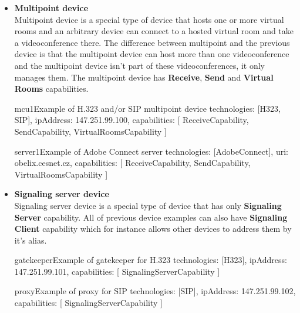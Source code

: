 \begin{itemize}
\begin{EntityExample}{}{terminal4}%
      {Example of terminal with one virtual room for H.323 and/or SIP}
technologies: [H323, SIP],
ipAddress: 147.251.99.4,
capabilities: [
  TerminalCapability,
  ReceiveCapability,
  SendCapability
  MixCapability
]
\end{EntityExample}

\item \textbf{Multipoint device} \\
  Multipoint device is a special type of device that hosts one or more virtual 
  rooms and an arbitrary device can connect to a hosted virtual room and take 
  a videoconference there. The difference between multipoint and the previous 
  device is that the multipoint device can host more than one videoconference 
  and the multipoint device isn't part of these videoconferences, it only 
  manages them. The multipoint device has \textbf{Receive}, \textbf{Send}
  and \textbf{Virtual Rooms} capabilities.

\begin{EntityExample}{}{mcu1}{Example of H.323 and/or SIP multipoint device}
technologies: [H323, SIP],
ipAddress: 147.251.99.100,
capabilities: [
  ReceiveCapability,
  SendCapability,
  VirtualRoomsCapability
]
\end{EntityExample}

\begin{EntityExample}{}{server1}{Example of Adobe Connect server}
technologies: [AdobeConnect],
uri: obelix.cesnet.cz,
capabilities: [
  ReceiveCapability,
  SendCapability,
  VirtualRoomsCapability
]
\end{EntityExample}

\item \textbf{Signaling server device} \\
  Signaling server device is a special type of device that has only 
  \textbf{Signaling Server} capability. All of previous device examples can 
  also have \textbf{Signaling Client} capability which for instance allows 
  other devices to address them by it's alias.
    
\begin{EntityExample}{}{gatekeeper}{Example of gatekeeper for H.323}
technologies: [H323],
ipAddress: 147.251.99.101,
capabilities: [
  SignalingServerCapability
]
\end{EntityExample}

\begin{EntityExample}{}{proxy}{Example of proxy for SIP}
technologies: [SIP],
ipAddress: 147.251.99.102,
capabilities: [
  SignalingServerCapability
]
\end{EntityExample}


\end{itemize}
